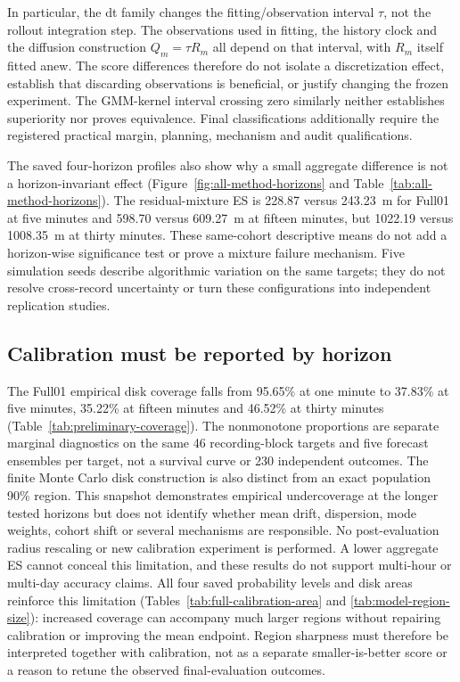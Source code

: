 \documentclass[11pt]{article}
\begin{document}
In particular, the dt family changes the fitting/observation interval $\tau$,
not the rollout integration step. The observations used in fitting, the
history clock and the diffusion construction $Q_m=\tau R_m$ all depend on
that interval, with $R_m$ itself fitted anew. The score differences therefore
do not isolate a discretization effect, establish that discarding observations
is beneficial, or justify changing the frozen experiment. The GMM-kernel
interval crossing zero similarly neither establishes superiority nor proves
equivalence. Final classifications additionally require the registered
practical margin, planning, mechanism and audit qualifications.

The saved four-horizon profiles also show why a small aggregate difference
is not a horizon-invariant effect (Figure~\ref{fig:all-method-horizons} and
Table~\ref{tab:all-method-horizons}). The residual-mixture ES is 228.87 versus
243.23~m for Full01 at five minutes and 598.70 versus 609.27~m at fifteen
minutes, but 1022.19 versus 1008.35~m at thirty minutes. These same-cohort
descriptive means do not add a horizon-wise significance test or prove a
mixture failure mechanism. Five simulation seeds describe algorithmic
variation on the same targets; they do not resolve cross-record uncertainty
or turn these configurations into independent replication studies.

\subsection{Calibration must be reported by horizon}
\label{sec:discussion-calibration}
The Full01 empirical disk coverage falls from 95.65\% at one minute to
37.83\% at five minutes, 35.22\% at fifteen minutes and 46.52\% at thirty
minutes (Table~\ref{tab:preliminary-coverage}). The nonmonotone proportions
are separate marginal diagnostics on the same 46 recording-block targets and
five forecast ensembles per target, not a survival curve or 230 independent
outcomes. The finite Monte Carlo disk construction is also distinct from an
exact population 90\% region. This snapshot demonstrates empirical
undercoverage at the longer tested horizons but does not identify whether
mean drift, dispersion, mode weights, cohort shift or several mechanisms
are responsible. No post-evaluation radius rescaling or new calibration
experiment is performed. A lower aggregate ES cannot conceal this limitation,
and these results do not support multi-hour or multi-day accuracy claims.
All four saved probability levels and disk areas reinforce this limitation
(Tables~\ref{tab:full-calibration-area} and \ref{tab:model-region-size}):
increased coverage can accompany much larger regions without repairing
calibration or improving the mean endpoint. Region sharpness must therefore
be interpreted together with calibration, not as a separate smaller-is-better
score or a reason to retune the observed final-evaluation outcomes.
\end{document}
